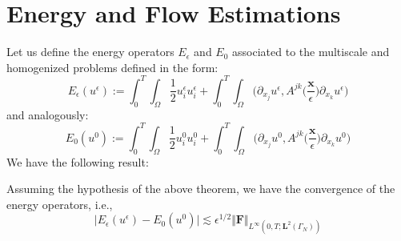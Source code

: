 \section{Energy and Flow Estimations}
Let us define the energy operators $E_{\epsilon}$ and $E_{0}$ associated to the multiscale and homogenized problems defined in the form:
\begin{equation*}
    E_{\epsilon}(u^{\epsilon}) := \int_0^T \int_{\Omega} \frac{1}{2}u_i^{\epsilon}u_i^{\epsilon} + \int_0^T \int_{\Omega} \big( \partial_{x_j} u^{\epsilon}, A^{jk} \big( \frac{\mathbf{x}}{\epsilon}\big) \partial_{x_k} u^{\epsilon} \big)
\end{equation*}
and analogously:
\begin{equation*}
    E_0(u^0) := \int_0^T \int_{\Omega} \frac{1}{2}u_i^{0}u_i^{0} + \int_0^T \int_{\Omega} \big( \partial_{x_j} u^0, A^{jk} \big( \frac{\mathbf{x}}{\epsilon}\big) \partial_{x_k} u^0 \big)
\end{equation*}
We have the following result:
\begin{lem}
Assuming the hypothesis of the above theorem, we have the convergence of the energy operators, i.e., 
\begin{equation*}
    \vert E_{\epsilon} (u^{\epsilon}) - E_0 (u^0) \vert \lesssim \epsilon^{1/2} \Vert \mathbf{F} \Vert_{L^{\infty}(0,T; \mathbf{L}^{2}(\Gamma_N))} 
\end{equation*}
\end{lem}
